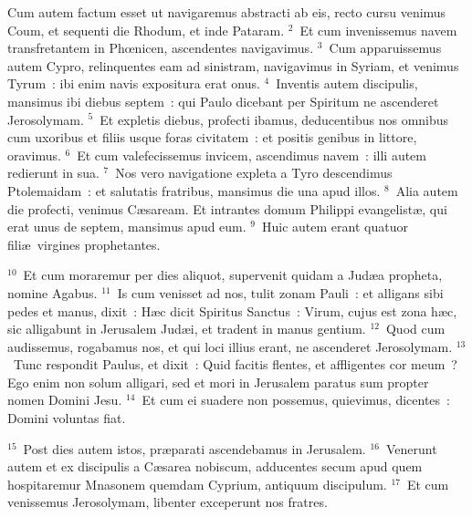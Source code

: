 \lettrine[lines=3,image=true,loversize=0.05,lraise=-0.03]{C}{}um autem factum esset ut navigaremus abstracti ab eis, recto cursu venimus Coum, et sequenti die Rhodum, et inde Pataram.
${}^{2}$~Et cum invenissemus navem transfretantem in Phœnicen, ascendentes navigavimus.
${}^{3}$~Cum apparuissemus autem Cypro, relinquentes eam ad sinistram, navigavimus in Syriam, et venimus Tyrum~: ibi enim navis expositura erat onus.
${}^{4}$~Inventis autem discipulis, mansimus ibi diebus septem~: qui Paulo dicebant per Spiritum ne ascenderet Jerosolymam.
${}^{5}$~Et expletis diebus, profecti ibamus, deducentibus nos omnibus cum uxoribus et filiis usque foras civitatem~: et positis genibus in littore, oravimus.
${}^{6}$~Et cum valefecissemus invicem, ascendimus navem~: illi autem redierunt in sua.
${}^{7}$~Nos vero navigatione expleta a Tyro descendimus Ptolemaidam~: et salutatis fratribus, mansimus die una apud illos.
${}^{8}$~Alia autem die profecti, venimus C\ae saream. Et intrantes domum Philippi evangelist\ae , qui erat unus de septem, mansimus apud eum.
${}^{9}$~Huic autem erant quatuor fili\ae\ virgines prophetantes.


${}^{10}$~Et cum moraremur per dies aliquot, supervenit quidam a Jud\ae a propheta, nomine Agabus.
${}^{11}$~Is cum venisset ad nos, tulit zonam Pauli~: et alligans sibi pedes et manus, dixit~: H\ae c dicit Spiritus Sanctus~: Virum, cujus est zona h\ae c, sic alligabunt in Jerusalem Jud\ae i, et tradent in manus gentium.
${}^{12}$~Quod cum audissemus, rogabamus nos, et qui loci illius erant, ne ascenderet Jerosolymam.
${}^{13}$~Tunc respondit Paulus, et dixit~: Quid facitis flentes, et affligentes cor meum~? Ego enim non solum alligari, sed et mori in Jerusalem paratus sum propter nomen Domini Jesu.
${}^{14}$~Et cum ei suadere non possemus, quievimus, dicentes~: Domini voluntas fiat.


${}^{15}$~Post dies autem istos, pr\ae parati ascendebamus in Jerusalem.
${}^{16}$~Venerunt autem et ex discipulis a C\ae sarea nobiscum, adducentes secum apud quem hospitaremur Mnasonem quemdam Cyprium, antiquum discipulum.
${}^{17}$~Et cum venissemus Jerosolymam, libenter exceperunt nos fratres.


